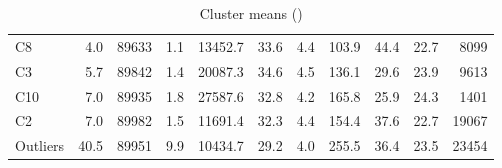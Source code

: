 \begin{table}
\begin{tabular}{l|rrrr|rrrrr|r}
C8  &         4.0 &       89633 &     1.1 &                     13452.7 &          33.6 &          4.4 &       103.9 &            44.4 &           22.7 &  8099 \\
C3  &         5.7 &       89842 &     1.4 &                     20087.3 &          34.6 &          4.5 &       136.1 &            29.6 &           23.9 &  9613 \\
C10 &         7.0 &       89935 &     1.8 &                     27587.6 &          32.8 &          4.2 &       165.8 &            25.9 &           24.3 &  1401 \\
C2  &         7.0 &       89982 &     1.5 &                     11691.4 &          32.3 &          4.4 &       154.4 &            37.6 &           22.7 & 19067 \\
Outliers  &        40.5 &       89951 &     9.9 &                     10434.7 &          29.2 &          4.0 &       255.5 &            36.4 &           23.5 & 23454 \\
\bottomrule
\end{tabular}
 \label{table:d11_gmm_mean}
 \caption{Cluster means (\deleven)}
 \end{table}
 
